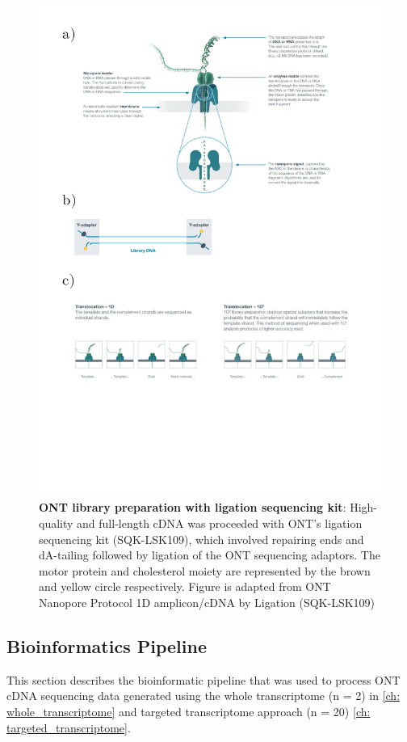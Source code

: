\begin{figure}[]
	\centering
	\includegraphics[page=3,trim={0 16cm 0 0 },clip, scale = 0.7]{Figures/ProjectDevelopment_FiguresONT}
	\captionsetup{width=0.95\textwidth}
	\caption[ONT library preparation with ligation sequencing kit]%
	{\textbf{ONT library preparation with ligation sequencing kit}: High-quality and full-length cDNA was proceeded with ONT's ligation sequencing kit (SQK-LSK109), which involved repairing ends and dA-tailing followed by ligation of the ONT sequencing adaptors. The motor protein and cholesterol moiety are represented by the brown and yellow circle respectively. Figure is adapted from ONT Nanopore Protocol 1D amplicon/cDNA by Ligation (SQK-LSK109)}
	\label{fig:ONT_Protocol}
\end{figure}

 

\clearpage
\subsection{Bioinformatics Pipeline}
This section describes the bioinformatic pipeline that was used to process ONT cDNA sequencing data generated using the whole transcriptome (n = 2) in \cref{ch: whole_transcriptome} and targeted transcriptome approach (n = 20) \cref{ch: targeted_transcriptome}. 

